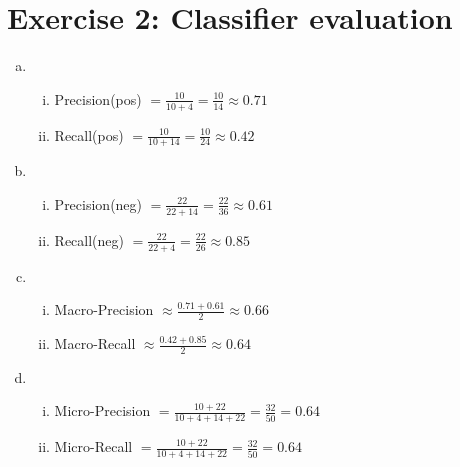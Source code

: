 \documentclass{article}
\begin{document}
\section{Exercise 2: Classifier evaluation}
\begin{enumerate}[a.]
\item 
\begin{enumerate}[i.]
\item Precision(pos) $= \frac{10}{10+4} = \frac{10}{14} \approx 0.71$
\item Recall(pos) $= \frac{10}{10+14} = \frac{10}{24} \approx 0.42$
\end{enumerate}
\item 
\begin{enumerate}[i.]
\item Precision(neg) $= \frac{22}{22+14} = \frac{22}{36} \approx 0.61$
\item Recall(neg) $= \frac{22}{22+4} = \frac{22}{26} \approx 0.85$
\end{enumerate}
\item 
\begin{enumerate}[i.]
\item Macro-Precision $\approx \frac{0.71 + 0.61}{2} \approx 0.66$
\item Macro-Recall $\approx \frac{0.42 + 0.85}{2} \approx 0.64$
\end{enumerate}
\item 
\begin{enumerate}[i.]
\item Micro-Precision $= \frac{10+22}{10+4+14+22} = \frac{32}{50} = 0.64$
\item Micro-Recall $= \frac{10+22}{10+4+14+22} = \frac{32}{50} = 0.64$
\end{enumerate}
\end{enumerate}
\end{document}
